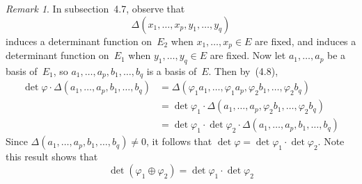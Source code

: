 \documentclass[letterpaper,12pt]{article}
\newcommand{\dsum}{\oplus}
\newcommand{\mult}{\cdot}
\theoremstyle{definition}
\theoremstyle{remark}
\newtheorem*{rmk}{Remark}
\begin{document}
\begin{rmk}
In subsection~4.7, observe that
\[\Delta(x_1,\ldots,x_p,y_1,\ldots,y_q)\]
induces a determinant function on~\(E_2\) when \(x_1,\ldots,x_p\in E\) are fixed, and induces a determinant function on~\(E_1\) when \(y_1,\ldots,y_q\in E\) are fixed. Now let \(a_1,\ldots,a_p\) be a basis of~\(E_1\), so \(a_1,\ldots,a_p,b_1,\ldots,b_q\) is a basis of~\(E\). Then by~(4.8),
\begin{align*}
\det\varphi\mult\Delta(a_1,\ldots,a_p,b_1,\ldots,b_q)&=\Delta(\varphi_1 a_1,\ldots,\varphi_1 a_p,\varphi_2 b_1,\ldots,\varphi_2 b_q)\\
	&=\det\varphi_1\mult\Delta(a_1,\ldots,a_p,\varphi_2 b_1,\ldots,\varphi_2 b_q)\\
	&=\det\varphi_1\mult\det\varphi_2\mult\Delta(a_1,\ldots,a_p,b_1,\ldots,b_q)
\end{align*}
Since \(\Delta(a_1,\ldots,a_p,b_1,\ldots,b_q)\ne0\), it follows that \(\det\varphi=\det\varphi_1\mult\det\varphi_2\). Note this result shows that
\[\det(\varphi_1\dsum\varphi_2)=\det\varphi_1\mult\det\varphi_2\]
\end{rmk}
\end{document}
